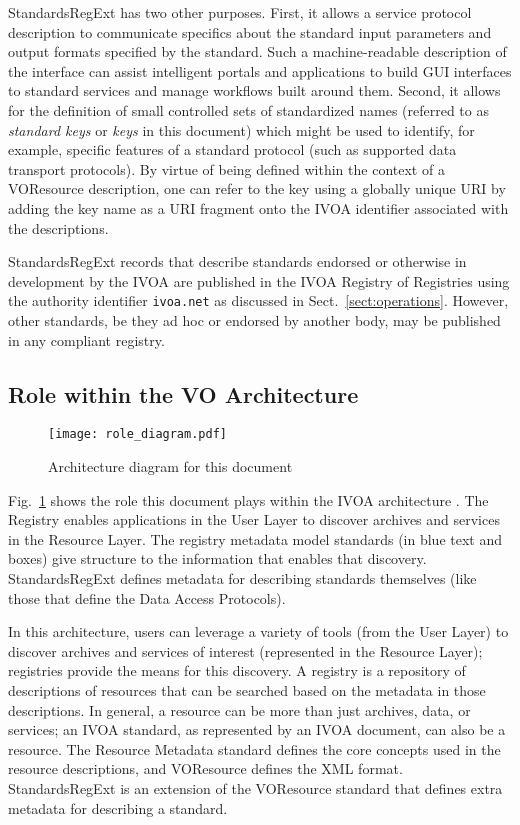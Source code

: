 \documentclass[11pt,a4paper]{ivoa}
\begin{document}
StandardsRegExt has two other purposes.  First, it allows a service
protocol description to communicate specifics about the standard input
parameters and output formats specified by the standard.  Such a
machine-readable description of the interface can assist intelligent
portals and applications to build GUI interfaces to standard services
and manage workflows built around them.  Second, it allows for the
definition of small controlled sets of standardized names (referred to
as \emph{standard keys} or \emph{keys} in this document) which might be used to identify,
for example, specific features of a standard protocol (such as
supported data transport protocols).  By virtue of being defined
within the context of a VOResource description, one can refer to the
key using a globally unique URI by adding the key name as a URI fragment
onto the IVOA identifier associated with the
descriptions.



StandardsRegExt records that describe standards
endorsed or otherwise in development by the IVOA are published in
the IVOA Registry of Registries \citep{2007ivoa.rept.0628P} using the
authority identifier \texttt{ivoa.net} as discussed in
Sect.~\ref{sect:operations}.
However, other standards, be they ad hoc or endorsed by another
body, may be published in any compliant registry.



\subsection{Role within the VO Architecture}

\begin{figure}
\centering
\texttt{[image: role\_diagram.pdf]}
\caption{Architecture diagram for this document}
\label{fig:archdiag}
\end{figure}

Fig.~\ref{fig:archdiag} shows the role this document plays within the
IVOA architecture \citep{2021ivoa.spec.1101D}.
The Registry enables applications in the User Layer to discover
archives and services in the Resource Layer.  The registry metadata
model standards (in blue text and boxes) give structure to the
information that enables that discovery.  StandardsRegExt defines metadata
for describing standards themselves (like those that define the Data
Access Protocols).



In this architecture, users can leverage a variety of tools (from the
User Layer) to discover archives and services of interest (represented
in the Resource Layer); registries provide the means for this
discovery. A registry is a repository of descriptions of resources
that can be searched based on the metadata in those descriptions. In
general, a resource can be more than just archives, data, or
services; an IVOA standard, as represented by an IVOA document, can
also be a resource.  The Resource Metadata standard
defines the core concepts used in the resource
descriptions, and VOResource defines
the XML format.  StandardsRegExt is an extension of the VOResource
standard that defines extra metadata for describing a standard.
\end{document}
